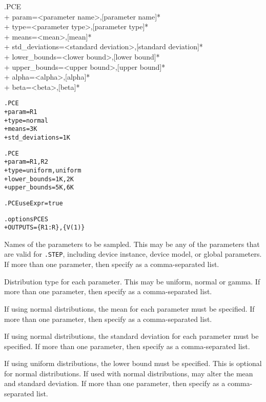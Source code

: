 \begin{Command}
\format
.PCE  \\
+ param=<parameter name>,[parameter name]*  \\
+ type=<parameter type>,[parameter type]*  \\
+ means=<mean>,[mean]*  \\
+ std\_deviations=<standard deviation>,[standard deviation]* \\
+ lower\_bounds=<lower bound>,[lower bound]*  \\
+ upper\_bounds=<upper bound>,[upper bound]* \\
+ alpha=<alpha>,[alpha]*  \\
+ beta=<beta>,[beta]*

\examples
\begin{alltt}
.PCE
+ param=R1
+ type=normal
+ means=3K
+ std\_deviations=1K

.PCE
+ param=R1,R2
+ type=uniform,uniform
+ lower\_bounds=1K,2K
+ upper\_bounds=5K,6K

.PCE useExpr=true

.options PCES 
+ OUTPUTS=\{R1:R\},\{V(1)\}
\end{alltt}

\arguments

\begin{Arguments}

Names of the parameters to be sampled.  This may be any of the parameters
that are valid for \verb|.STEP|, including device instance, device model,
or global parameters.  If more than one parameter, then specify as a
comma-separated list.

Distribution type for each parameter.  This may be uniform, normal or gamma.
If more than one parameter, then specify as a comma-separated list.

If using normal distributions, the mean for each parameter must be specified.
If more than one parameter, then specify as a comma-separated list.

If using normal distributions, the standard deviation for each parameter
must be specified.  If more than one parameter, then specify as a
comma-separated list.

If using uniform distributions, the lower bound must be specified.
This is optional for normal distributions.  If used with normal
distributions, may alter the mean and standard deviation.
If more than one parameter, then specify as a comma-separated list.


\end{Arguments}
\end{Command}
